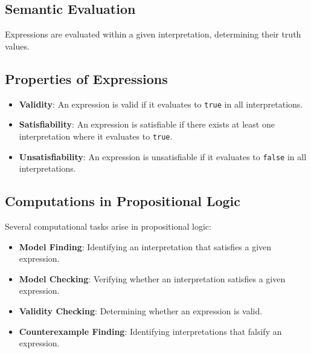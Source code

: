 \documentclass{book}
\providecommand{\tightlist}{%
  \setlength{\itemsep}{0pt}\setlength{\parskip}{0pt}}
\begin{document}
\hypertarget{book__pandoc__debug__src__languages.md__semantic-evaluation}{%
\subsection*{Semantic Evaluation}\label{book__pandoc__debug__src__languages.md__semantic-evaluation}}

Expressions are evaluated within a given interpretation, determining their truth values.

\hypertarget{book__pandoc__debug__src__languages.md__properties-of-expressions}{%
\subsection*{Properties of Expressions}\label{book__pandoc__debug__src__languages.md__properties-of-expressions}}

\begin{itemize}
\tightlist
\item
  \textbf{Validity}: An expression is valid if it evaluates to \texttt{true} in all interpretations.
\item
  \textbf{Satisfiability}: An expression is satisfiable if there exists at least one interpretation where it evaluates to \texttt{true}.
\item
  \textbf{Unsatisfiability}: An expression is unsatisfiable if it evaluates to \texttt{false} in all interpretations.
\end{itemize}

\hypertarget{book__pandoc__debug__src__languages.md__computations-in-propositional-logic}{%
\subsection*{Computations in Propositional Logic}\label{book__pandoc__debug__src__languages.md__computations-in-propositional-logic}}

Several computational tasks arise in propositional logic:

\begin{itemize}
\tightlist
\item
  \textbf{Model Finding}: Identifying an interpretation that satisfies a given expression.
\item
  \textbf{Model Checking}: Verifying whether an interpretation satisfies a given expression.
\item
  \textbf{Validity Checking}: Determining whether an expression is valid.
\item
  \textbf{Counterexample Finding}: Identifying interpretations that falsify an expression.
\end{itemize}
\end{document}
